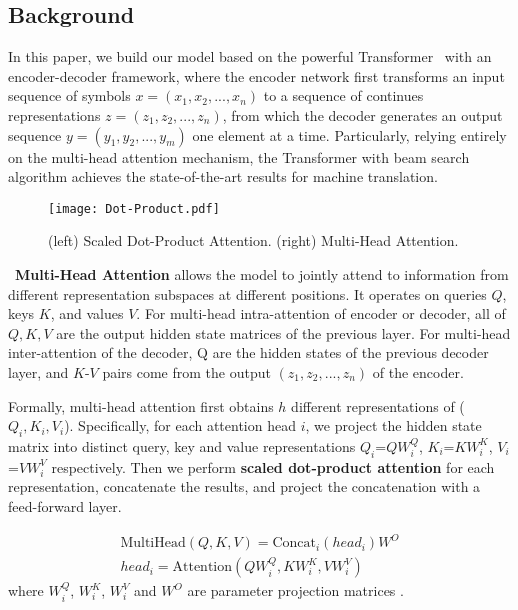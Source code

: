 \documentclass[11pt,a4paper]{article}
\begin{document}
\begin{CJK*}{UTF8}{gbsn}
\section{Background}

In this paper, we build our model based on the powerful Transformer~\cite{vaswani2017attention} with an encoder-decoder framework, where the encoder network first transforms an input sequence of symbols $x=(x_1,x_2,...,x_n)$ to a sequence of continues representations $z=(z_1,z_2,...,z_n)$, from which the decoder generates an output sequence $y=(y_1,y_2,...,y_m)$ one element at a time.
Particularly, relying entirely on the multi-head attention mechanism, the Transformer with beam search algorithm achieves the state-of-the-art results for machine translation.

\begin{figure}
    \centering
    \texttt{[image: Dot-Product.pdf]}
    \caption{(left) Scaled Dot-Product Attention. (right) Multi-Head Attention.
    }\label{Dot-Procdut}
\end{figure}

~\textbf{Multi-Head Attention} allows the model to jointly attend to information from different representation subspaces at different positions.
It operates on queries $Q$, keys $K$, and values $V$.
For multi-head intra-attention of encoder or decoder, all of $Q, K, V$ are the output hidden state matrices of the previous layer. For multi-head inter-attention of the decoder, Q are the hidden states of the previous decoder layer, and $K$-$V$ pairs come from the output $(z_1, z_2,..., z_n)$ of the encoder.

Formally, multi-head attention first obtains $h$ different representations of ($Q_i,K_i,V_i$). Specifically, for each attention head $i$, we project the hidden state matrix into distinct query, key and value representations $Q_i$=$QW_i^Q$, $K_i$=$KW_i^K$,  $V_i$=$VW_i^V$ respectively.
Then we perform {\bf scaled dot-product attention} for each representation, concatenate the results, and project the concatenation
with a feed-forward layer.  

\begin{equation}
	\begin{aligned} \label{MHAtt}
		\mbox{MultiHead}(Q,K,V) = \mbox{Concat}_i(head_i)W^O  \\
		head_i = \mbox{Attention}(QW_i^Q, KW_i^K, VW_i^V)
	\end{aligned}
\end{equation}
where $W_i^Q$, $W_i^K$, $W_i^V$ and $W^O$ are parameter projection matrices .


\end{CJK*}
\end{document}
